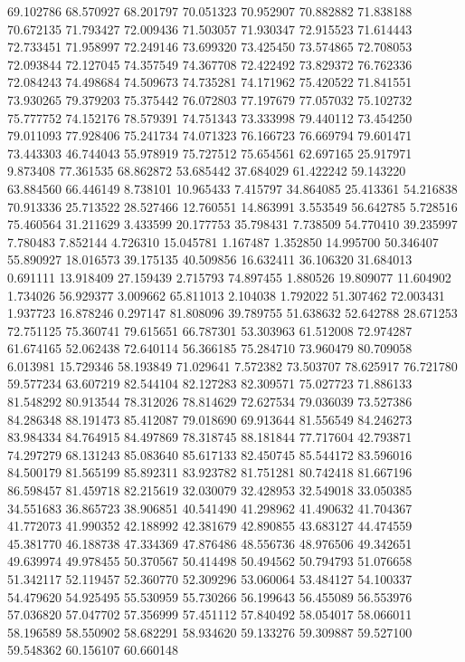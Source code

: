 69.102786
68.570927
68.201797
70.051323
70.952907
70.882882
71.838188
70.672135
71.793427
72.009436
71.503057
71.930347
72.915523
71.614443
72.733451
71.958997
72.249146
73.699320
73.425450
73.574865
72.708053
72.093844
72.127045
74.357549
74.367708
72.422492
73.829372
76.762336
72.084243
74.498684
74.509673
74.735281
74.171962
75.420522
71.841551
73.930265
79.379203
75.375442
76.072803
77.197679
77.057032
75.102732
75.777752
74.152176
78.579391
74.751343
73.333998
79.440112
73.454250
79.011093
77.928406
75.241734
74.071323
76.166723
76.669794
79.601471
73.443303
46.744043
55.978919
75.727512
75.654561
62.697165
25.917971
9.873408
77.361535
68.862872
53.685442
37.684029
61.422242
59.143220
63.884560
66.446149
8.738101
10.965433
7.415797
34.864085
25.413361
54.216838
70.913336
25.713522
28.527466
12.760551
14.863991
3.553549
56.642785
5.728516
75.460564
31.211629
3.433599
20.177753
35.798431
7.738509
54.770410
39.235997
7.780483
7.852144
4.726310
15.045781
1.167487
1.352850
14.995700
50.346407
55.890927
18.016573
39.175135
40.509856
16.632411
36.106320
31.684013
0.691111
13.918409
27.159439
2.715793
74.897455
1.880526
19.809077
11.604902
1.734026
56.929377
3.009662
65.811013
2.104038
1.792022
51.307462
72.003431
1.937723
16.878246
0.297147
81.808096
39.789755
51.638632
52.642788
28.671253
72.751125
75.360741
79.615651
66.787301
53.303963
61.512008
72.974287
61.674165
52.062438
72.640114
56.366185
75.284710
73.960479
80.709058
6.013981
15.729346
58.193849
71.029641
7.572382
73.503707
78.625917
76.721780
59.577234
63.607219
82.544104
82.127283
82.309571
75.027723
71.886133
81.548292
80.913544
78.312026
78.814629
72.627534
79.036039
73.527386
84.286348
88.191473
85.412087
79.018690
69.913644
81.556549
84.246273
83.984334
84.764915
84.497869
78.318745
88.181844
77.717604
42.793871
74.297279
68.131243
85.083640
85.617133
82.450745
85.544172
83.596016
84.500179
81.565199
85.892311
83.923782
81.751281
80.742418
81.667196
86.598457
81.459718
82.215619
32.030079
32.428953
32.549018
33.050385
34.551683
36.865723
38.906851
40.541490
41.298962
41.490632
41.704367
41.772073
41.990352
42.188992
42.381679
42.890855
43.683127
44.474559
45.381770
46.188738
47.334369
47.876486
48.556736
48.976506
49.342651
49.639974
49.978455
50.370567
50.414498
50.494562
50.794793
51.076658
51.342117
52.119457
52.360770
52.309296
53.060064
53.484127
54.100337
54.479620
54.925495
55.530959
55.730266
56.199643
56.455089
56.553976
57.036820
57.047702
57.356999
57.451112
57.840492
58.054017
58.066011
58.196589
58.550902
58.682291
58.934620
59.133276
59.309887
59.527100
59.548362
60.156107
60.660148
